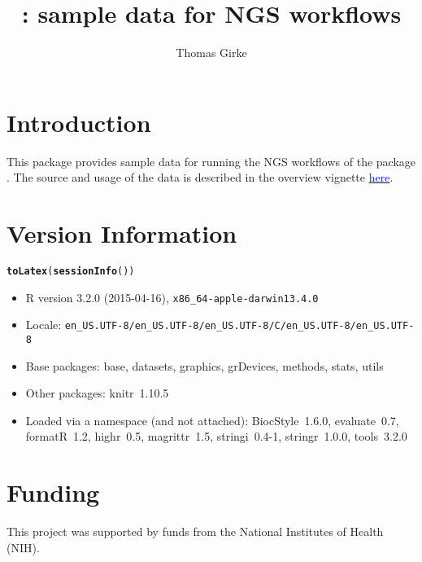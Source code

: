 \documentclass{article}\usepackage[]{graphicx}\usepackage[]{color}
\makeatletter
\newcommand{\hlstd}[1]{\textcolor[rgb]{0.345,0.345,0.345}{#1}}%
\newcommand{\hlkwd}[1]{\textcolor[rgb]{0.737,0.353,0.396}{\textbf{#1}}}%
\newenvironment{kframe}{%
 \def\at@end@of@kframe{}%
 \ifinner\ifhmode%
  \def\at@end@of@kframe{\end{minipage}}%
  \begin{minipage}{\columnwidth}%
 \fi\fi%
 \def\FrameCommand##1{\hskip\@totalleftmargin \hskip-\fboxsep
 \colorbox{shadecolor}{##1}\hskip-\fboxsep
     \hskip-\linewidth \hskip-\@totalleftmargin \hskip\columnwidth}%
 \MakeFramed {\advance\hsize-\width
   \@totalleftmargin\z@ \linewidth\hsize
   \@setminipage}}%
 {\par\unskip\endMakeFramed%
 \at@end@of@kframe}
\makeatother
\begin{document}
\title{: sample data for NGS workflows}
\author{Thomas Girke}
\maketitle

\tableofcontents

\section{Introduction}
This package provides sample data for running the NGS workflows of the  package \citep{Girke2014-oy}. The source and usage of the data is described in the overview vignette \href{http://www.bioconductor.org/packages/devel/bioc/html/systemPipeR.html}{\textcolor{blue}{here}}.

\section{Version Information}
\begin{kframe}
\begin{alltt}
\hlkwd{toLatex}\hlstd{(}\hlkwd{sessionInfo}\hlstd{())}
\end{alltt}
\end{kframe}\begin{itemize}\raggedright
  \item R version 3.2.0 (2015-04-16), \verb|x86_64-apple-darwin13.4.0|
  \item Locale: \verb|en_US.UTF-8/en_US.UTF-8/en_US.UTF-8/C/en_US.UTF-8/en_US.UTF-8|
  \item Base packages: base, datasets, graphics, grDevices, methods, stats, utils
  \item Other packages: knitr~1.10.5
  \item Loaded via a namespace (and not attached): BiocStyle~1.6.0, evaluate~0.7,
    formatR~1.2, highr~0.5, magrittr~1.5, stringi~0.4-1, stringr~1.0.0, tools~3.2.0
\end{itemize}


\section{Funding}
This project was supported by funds from the National Institutes of Health (NIH).


\end{document}

